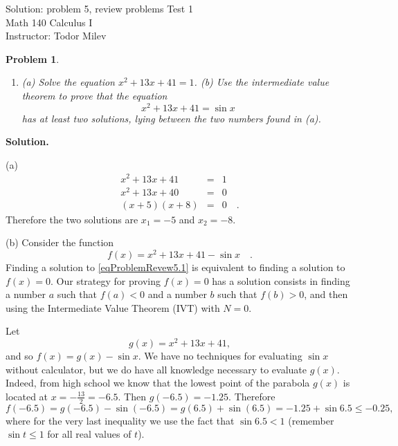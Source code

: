 \documentclass{article}
\newtheorem{problem}{Problem}
\begin{document}
\begin{center}
\Large
Solution: problem 5, review problems Test 1\\ Math 140 Calculus I \\ \normalsize Instructor: Todor Milev
\end{center}



\begin{problem}~
\begin{enumerate}
\item (a) Solve the equation $x^2+13x+41=1$.  (b) Use the intermediate value theorem to prove that the equation 
\begin{equation}\label{eqProblemRevew5.1}
x^2+13x+41=\sin  x
\end{equation} has at least two solutions, lying between the two numbers found in (a).
\end{enumerate}
\end{problem}
\textbf{Solution.} 

\noindent (a) 
\begin{eqnarray*}
x^2+13x+41&=&1\\
x^2+13x+40&=&0\\
(x+5)(x+8)&=&0\quad .
\end{eqnarray*}
Therefore the two solutions are $x_1=-5$ and $x_2=-8$.

\noindent (b) Consider the function
\[
f(x)=x^2+13x+41-\sin x\quad. 
\]
Finding a solution to \eqref{eqProblemRevew5.1} is equivalent to finding a solution to $f(x)=0$. Our strategy for proving $f(x)=0$ has a solution consists in finding a number $a$ such that $f(a)<0$ and a number $b$ such that $f(b)>0$, and then using the Intermediate Value Theorem (IVT) with $N=0$. 

Let 
\[
g(x)=x^2+13x+41,
\]
and so $f(x)=g(x)-\sin x$. We have no techniques for evaluating $\sin x$ without calculator, but we do have all knowledge necessary to evaluate $g(x)$. Indeed, from high school we know that the lowest point of the parabola $g(x)$ is located at $x=-\frac{13}2=-6.5$. Then $g(-6.5)= -1.25$. Therefore 
\[
f(-6.5)=g(-6.5)-\sin(-6.5)= g(6.5)+\sin (6.5)=-1.25+\sin 6.5 \leq -0.25, 
\]
where for the very last inequality we use the fact that $\sin 6.5< 1 $ (remember $\sin t\leq 1$ for all real values of $t$).
\end{document}
